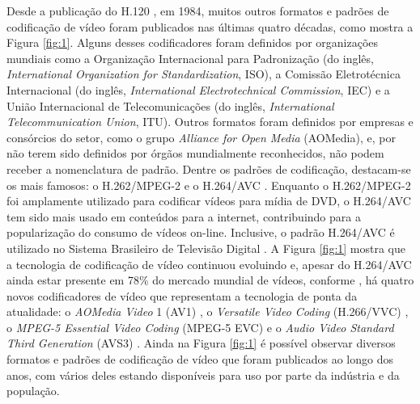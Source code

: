 Desde a publicação do H.120 \cite{bib:h120}, em 1984, muitos outros formatos e padrões de codificação de vídeo foram publicados nas últimas quatro décadas, como mostra a Figura \ref{fig:1}. Alguns desses codificadores foram definidos por organizações mundiais como a Organização Internacional para Padronização (do inglês, \textit{International Organization for Standardization}, ISO), a Comissão Eletrotécnica Internacional (do inglês, \textit{International Electrotechnical Commission}, IEC) e a União Internacional de Telecomunicações (do inglês, \textit{International Telecommunication Union}, ITU). Outros formatos foram definidos por empresas e consórcios do setor, como o grupo \textit{Alliance for Open Media} (AOMedia), e, por não terem sido definidos por órgãos mundialmente reconhecidos, não podem receber a nomenclatura de padrão. Dentre os padrões de codificação, destacam-se os mais famosos: o H.262/MPEG-2 \cite{bib:mpeg2} e o H.264/AVC \cite{bib:h264overview2}. Enquanto o H.262/MPEG-2 foi amplamente utilizado para codificar vídeos para mídia de DVD, o H.264/AVC tem sido mais usado em conteúdos para a internet, contribuindo para a popularização do consumo de vídeos on-line. Inclusive, o padrão H.264/AVC é utilizado no Sistema Brasileiro de Televisão Digital \cite{bib:dissertacao_rodrigues_2008}. A Figura \ref{fig:1} mostra que a tecnologia de codificação de vídeo continuou evoluindo e, apesar do H.264/AVC ainda estar presente em 78\% do mercado mundial de vídeos, conforme \cite{bib:bitmovin_report_2022}, há quatro novos codificadores de vídeo que representam a tecnologia de ponta da atualidade: o \textit{AOMedia Video} 1 (AV1) \cite{bib:av1_overview_2021}, o \textit{Versatile Video Coding} (H.266/VVC) \cite{bib:vvc}, o \textit{MPEG-5 Essential Video Coding} (MPEG-5 EVC) \cite{bib:evc} e o \textit{Audio Video Standard Third Generation} (AVS3) \cite{bib:avs3}. Ainda na Figura \ref{fig:1} é possível observar diversos formatos e padrões de codificação de vídeo que foram publicados ao longo dos anos, com vários deles estando disponíveis para uso por parte da indústria e da população.

 

